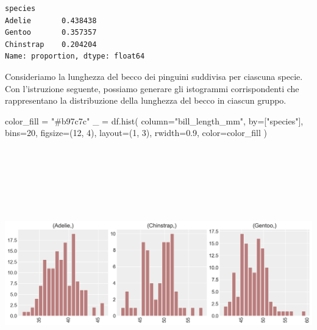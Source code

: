 \documentclass[
  letterpaper,
  krantz2]{{[}./krantz{]}}
\newenvironment{Shaded}{\begin{snugshade}}{\end{snugshade}}
\newcommand{\DecValTok}[1]{\textcolor[rgb]{0.68,0.00,0.00}{#1}}
\newcommand{\FloatTok}[1]{\textcolor[rgb]{0.68,0.00,0.00}{#1}}
\newcommand{\NormalTok}[1]{\textcolor[rgb]{0.00,0.23,0.31}{#1}}
\newcommand{\OperatorTok}[1]{\textcolor[rgb]{0.37,0.37,0.37}{#1}}
\newcommand{\StringTok}[1]{\textcolor[rgb]{0.13,0.47,0.30}{#1}}
\begin{document}
\begin{verbatim}
species
Adelie       0.438438
Gentoo       0.357357
Chinstrap    0.204204
Name: proportion, dtype: float64
\end{verbatim}

Consideriamo la lunghezza del becco dei pinguini suddivisa per ciascuna
specie. Con l'istruzione seguente, possiamo generare gli istogrammi
corrispondenti che rappresentano la distribuzione della lunghezza del
becco in ciascun gruppo.

\begin{Shaded}
\begin{Highlighting}[]
\NormalTok{color\_fill }\OperatorTok{=} \StringTok{"\#b97c7c"}
\NormalTok{\_ }\OperatorTok{=}\NormalTok{ df.hist(}
\NormalTok{    column}\OperatorTok{=}\StringTok{"bill\_length\_mm"}\NormalTok{,}
\NormalTok{    by}\OperatorTok{=}\NormalTok{[}\StringTok{"species"}\NormalTok{],}
\NormalTok{    bins}\OperatorTok{=}\DecValTok{20}\NormalTok{,}
\NormalTok{    figsize}\OperatorTok{=}\NormalTok{(}\DecValTok{12}\NormalTok{, }\DecValTok{4}\NormalTok{),}
\NormalTok{    layout}\OperatorTok{=}\NormalTok{(}\DecValTok{1}\NormalTok{, }\DecValTok{3}\NormalTok{),}
\NormalTok{    rwidth}\OperatorTok{=}\FloatTok{0.9}\NormalTok{,}
\NormalTok{    color}\OperatorTok{=}\NormalTok{color\_fill}
\NormalTok{)}
\end{Highlighting}
\end{Shaded}

\includegraphics[width=12.61458in,height=4.28125in]{chapters/python/05_pandas_aggregate_files/figure-pdf/cell-13-output-1.png}
\end{document}
